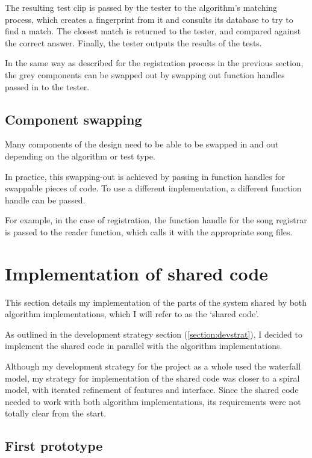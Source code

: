 \documentclass[12pt,a4paper,twoside,openright]{report}
\begin{document}
The resulting test clip is passed by the tester to the algorithm's matching process, which creates a fingerprint from it and consults its database to try to find a match. The closest match is returned to the tester, and compared against the correct answer. Finally, the tester outputs the results of the tests.

In the same way as described for the registration process in the previous section, the grey components can be swapped out by swapping out function handles passed in to the tester.


\subsection{Component swapping}

Many components of the design need to be able to be swapped in and out depending on the algorithm or test type. 

In practice, this swapping-out is achieved by passing in function handles for swappable pieces of code. To use a different implementation, a different function handle can be passed.

For example, in the case of registration, the function handle for the song registrar is passed to the reader function, which calls it with the appropriate song files.


\section{Implementation of shared code}
\label{section:sharedimpl}

This section details my implementation of the parts of the system shared by both algorithm implementations, which I will refer to as the `shared code'.

As outlined in the development strategy section (\ref{section:devstrat}), I decided to implement the shared code in parallel with the algorithm implementations.

Although my development strategy for the project as a whole used the waterfall model, my strategy for implementation of the shared code was closer to a spiral model, with iterated refinement of features and interface. Since the shared code needed to work with both algorithm implementations, its requirements were not totally clear from the start. 


\subsection{First prototype}
\end{document}
